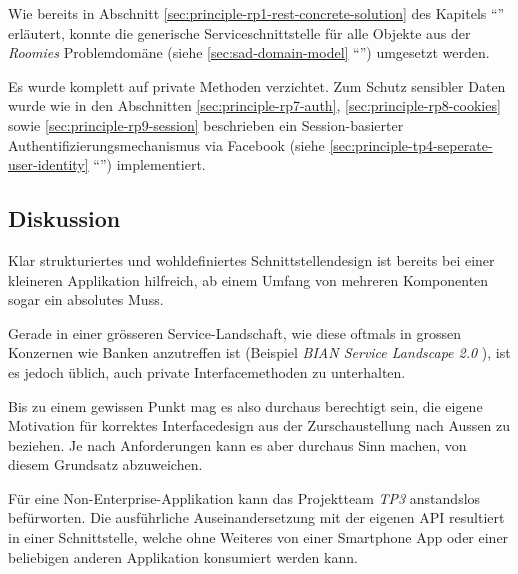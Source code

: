 Wie bereits in Abschnitt \ref{sec:principle-rp1-rest-concrete-solution} des Kapitels ``'' erläutert, konnte die generische Serviceschnittstelle für alle Objekte aus der \emph{Roomies} Problemdomäne (siehe \ref{sec:sad-domain-model} ``'') umgesetzt werden.

Es wurde komplett auf private Methoden verzichtet. Zum Schutz sensibler Daten wurde wie in den Abschnitten \ref{sec:principle-rp7-auth}, \ref{sec:principle-rp8-cookies} sowie \ref{sec:principle-rp9-session} beschrieben ein Session-basierter Authentifizierungsmechanismus via Facebook (siehe \ref{sec:principle-tp4-seperate-user-identity} ``'') implementiert.


\subsection*{Diskussion}

Klar strukturiertes und wohldefiniertes Schnittstellendesign ist bereits bei einer kleineren Applikation hilfreich, ab einem Umfang von mehreren Komponenten sogar ein absolutes Muss.

Gerade in einer grösseren Service-Landschaft, wie diese oftmals in grossen Konzernen wie Banken anzutreffen ist (Beispiel \emph{BIAN Service Landscape 2.0} \cite{BIANServiceLandscape}), ist es jedoch üblich, auch private Interfacemethoden zu unterhalten.

Bis zu einem gewissen Punkt mag es also durchaus berechtigt sein, die eigene Motivation für korrektes Interfacedesign aus der Zurschaustellung nach Aussen zu beziehen. Je nach Anforderungen kann es aber durchaus Sinn machen, von diesem Grundsatz abzuweichen.

Für eine Non-Enterprise-Applikation kann das Projektteam \emph{TP3} anstandslos befürworten. Die ausführliche Auseinandersetzung mit der eigenen API resultiert in einer Schnittstelle, welche ohne Weiteres von einer Smartphone App oder einer beliebigen anderen Applikation konsumiert werden kann.